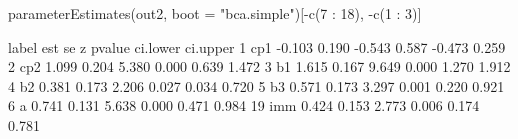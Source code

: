 \begin{Schunk}
\begin{Sinput}
 parameterEstimates(out2, 
                    boot = "bca.simple")[-c(7 : 18), -c(1 : 3)]
\end{Sinput}
\begin{Soutput}
   label    est    se      z pvalue ci.lower ci.upper
1    cp1 -0.103 0.190 -0.543  0.587   -0.473    0.259
2    cp2  1.099 0.204  5.380  0.000    0.639    1.472
3     b1  1.615 0.167  9.649  0.000    1.270    1.912
4     b2  0.381 0.173  2.206  0.027    0.034    0.720
5     b3  0.571 0.173  3.297  0.001    0.220    0.921
6      a  0.741 0.131  5.638  0.000    0.471    0.984
19   imm  0.424 0.153  2.773  0.006    0.174    0.781
\end{Soutput}
\end{Schunk}
